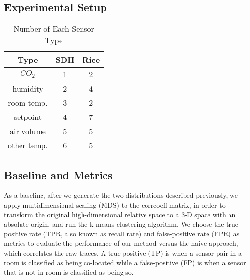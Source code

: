 \subsection{Experimental Setup}
\begin{table}[ht!]
\caption{Number of Each Sensor Type}
\centering %
\begin{tabular}{c c c}%
\hline %
Type & SDH & Rice \\ %
\hline\hline %
$CO_{2}$ & 1 & 2 \\ %
humidity & 2 & 4 \\
room temp. & 3 & 2 \\
setpoint & 4 & 7 \\
air volume & 5 & 5 \\ %
other temp. & 6 & 5 \\ %
\hline %
\end{tabular}
\label{table:roomspec} %
\end{table}

\subsection{Baseline and Metrics}

As a baseline, after we generate the two distributions described previously, we apply multidimensional scaling (MDS) to the corrcoeff matrix, in order to transform the original high-dimensional relative space to a 3-D space with an absolute origin, and run the k-means clustering algorithm.
We choose the true-positive rate (TPR, also known as recall rate) and false-positive rate (FPR) as metrics to evaluate the performance of our method versus the naive approach, which correlates the raw traces. A true-positive (TP) is when a sensor pair in a room is classified as being co-located 
while a false-positive (FP) is when a sensor that is not in room is classified as being so.

